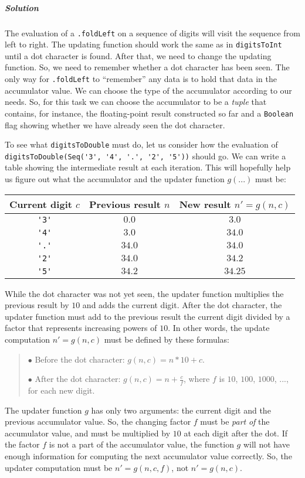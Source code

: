 \subparagraph{Solution}

The evaluation of a \lstinline!.foldLeft! on a sequence of digits
will visit the sequence from left to right. The updating function
should work the same as in \lstinline!digitsToInt! until a dot character
is found. After that, we need to change the updating function. So,
we need to remember whether a dot character has been seen. The only
way for \lstinline!.foldLeft! to ``remember'' any data is to hold
that data in the accumulator value. We can choose the type of the
accumulator according to our needs. So, for this task we can choose
the accumulator to be a \emph{tuple} that contains, for instance,
the floating-point result constructed so far and a \lstinline!Boolean!
flag showing whether we have already seen the dot character.

To see what \lstinline!digitsToDouble! must do, let us consider how
the evaluation of \lstinline!digitsToDouble(Seq('3', '4', '.', '2', '5'))!
should go. We can write a table showing the intermediate result at
each iteration. This will hopefully help us figure out what the accumulator
and the updater function $g(...)$ must be:
\begin{center}
\begin{tabular}{|c|c|c|}
\hline 
\textbf{\small{}Current digit $c$} & \textbf{\small{}Previous result $n$} & \textbf{\small{}New result $n'=g(n,c)$}\tabularnewline
\hline 
\hline 
\lstinline!'3'! & {\small{}$0.0$} & {\small{}$3.0$}\tabularnewline
\hline 
\lstinline!'4'! & {\small{}$3.0$} & {\small{}$34.0$}\tabularnewline
\hline 
\lstinline!'.'! & {\small{}$34.0$} & {\small{}$34.0$}\tabularnewline
\hline 
\lstinline!'2'! & {\small{}$34.0$} & {\small{}$34.2$}\tabularnewline
\hline 
\lstinline!'5'! & {\small{}$34.2$} & {\small{}$34.25$}\tabularnewline
\hline 
\end{tabular}
\par\end{center}

While the dot character was not yet seen, the updater function multiplies
the previous result by $10$ and adds the current digit. After the
dot character, the updater function must add to the previous result
the current digit divided by a factor that represents increasing powers
of $10$. In other words, the update computation $n'=g(n,c)$ must
be defined by these formulas:
\begin{quotation}
$\bullet$ Before the dot character: $g(n,c)=n*10+c$.

$\bullet$ After the dot character: $g(n,c)=n+\frac{c}{f}$, where
$f$ is $10$, $100$, $1000$, ..., for each new digit.
\end{quotation}
The updater function $g$ has only two arguments: the current digit
and the previous accumulator value. So, the changing factor $f$ must
be \emph{part} \emph{of} the accumulator value, and must be multiplied
by $10$ at each digit after the dot. If the factor $f$ is not a
part of the accumulator value, the function $g$ will not have enough
information for computing the next accumulator value correctly. So,
the updater computation must be $n'=g(n,c,f)$, not $n'=g(n,c)$.

